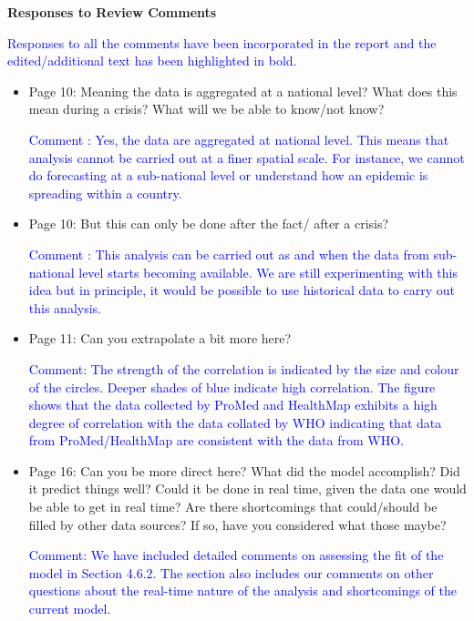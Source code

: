 \documentclass[a4paper,12pt]{article}
\def\sb#1{\textcolor{blue}{#1}}
\begin{document}
\begin{center}
 \textbf{\large Responses to Review Comments}
\end{center}

\sb{Responses to all the comments have been incorporated in the report and the
edited/additional text has been highlighted in bold.}

\begin{itemize}
\item[] Page 10: Meaning the data is aggregated at a national level? What does this mean during a crisis? What will we be able to know/not know?
 

\sb{Comment : Yes, the data are aggregated at national level. This means that analysis cannot be carried out at a finer spatial scale. For instance, we cannot do forecasting at a sub-national level or understand how an epidemic is spreading within a country.}
 

\item[] Page 10: But this can only be done after the fact/ after a crisis?

\sb{Comment : This analysis can be carried out as and when the data from sub-national level starts becoming available. We are still experimenting with this idea but in principle, it would be possible to use historical data to carry out this analysis.}
 

\item[] Page 11: Can you extrapolate a bit more here? 

\sb{Comment: The strength of the correlation is indicated by the size
  and colour of the circles. Deeper shades of blue indicate high
  correlation. The figure shows that the data collected by ProMed and
  HealthMap exhibits a high degree of correlation with the data
  collated by WHO indicating that data from ProMed/HealthMap are
  consistent with the data from WHO.}
 

\item[] Page 16: Can you be more direct here? What did the model accomplish?
Did it predict things well? Could it be done in real time, given the
data one would be able to get in real time? Are there shortcomings that could/should be filled by other data sources? If so, have you considered what those maybe?
 
\sb{Comment: We have included detailed comments on assessing the fit of
the model in Section 4.6.2. The section also includes our comments on
other questions about the real-time nature of the analysis and
shortcomings of the current model.}
\end{itemize}
\end{document}
